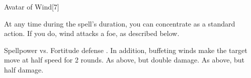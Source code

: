 \begin{spellsection}{Avatar of Wind}[7]
    \begin{spellheader}
    \end{spellheader}
    \begin{spellcontent}
        \begin{spelltargetinginfo}
        \end{spelltargetinginfo}
        \begin{spelleffects}
            \spelleffect At any time during the spell's duration, you can concentrate as a standard action. If you do, wind attacks a foe, as described below.
            \spelldur \durlong
        \end{spelleffects}
    \end{spellcontent}
    \begin{spellsubcontent}
        \begin{spelltargetinginfo}
        \end{spelltargetinginfo}
        \begin{spelleffects}
            \begin{spellattack}{Spellpower vs. Fortitude defense}
                \spellsuccess {}. In addition, buffeting winds make the target move at half speed for 2 rounds.
                \spellcritical As above, but double damage.
                \spellfailure As above, but half damage.
            \end{spellattack}
        \end{spelleffects}
    \end{spellsubcontent}
    \begin{spellfooter}
        \miscastexplode
    \end{spellfooter}
    \begin{spellaugments}
    \end{spellaugments}
\end{spellsection}

